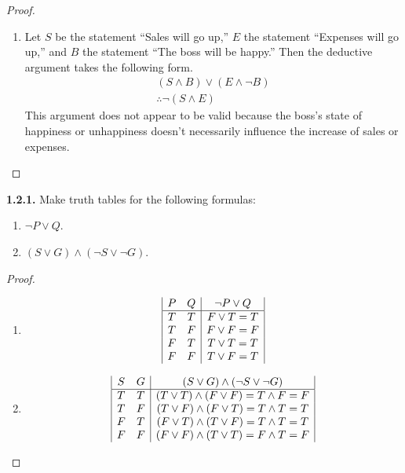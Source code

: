 \documentclass[12pt]{amsart}
\newenvironment{statement}[1]{\smallskip\noindent\color[rgb]{.6627, .3529, .6314} {\bf #1.}}{}
\theoremstyle{definition}
\theoremstyle{remark}
\begin{document}
\begin{proof}
\begin{enumerate}
	\item Let $S$ be the statement ``Sales will go up,'' $E$ the statement ``Expenses will go up,'' and $B$ the statement ``The boss will be happy.''
	Then the deductive argument takes the following form.
	\begin{equation*}
		\begin{array}{l}
			(S \wedge B) \vee (E \wedge \neg B) \\
			\hline
			\therefore \neg (S \wedge E)
		\end{array}
	\end{equation*}
	This argument does not appear to be valid because the boss's state of happiness or unhappiness doesn't necessarily influence the increase of sales or expenses.
\end{enumerate}
\end{proof}


\begin{statement}{1.2.1}
Make truth tables for the following formulas:
\begin{enumerate}
	\item $\neg P \vee Q$.
	\item $(S \vee G) \wedge (\neg S \vee \neg G)$.
\end{enumerate}
\end{statement}

\begin{proof}
\hfill
\begin{enumerate}
	\item 
	\begin{equation*}
		\begin{array}{| c c | c |}
			P & Q & \neg P \vee Q \\
			\hline
			T & T & F \vee T = T \\
			T & F & F \vee F = F \\
			F & T & T \vee T = T \\
			F & F & T \vee F = T
		\end{array}
	\end{equation*}
	
	\item 
	\begin{equation*}
		\begin{array}{| c c | c |}
			S & G & (S \vee G) \wedge (\neg S \vee \neg G) \\
			\hline
			T & T & (T \vee T) \wedge (F \vee F) = T \wedge F = F \\
			T & F & (T \vee F) \wedge (F \vee T) = T \wedge T = T \\
			F & T & (F \vee T) \wedge (T \vee F) = T \wedge T = T \\
			F & F & (F \vee F) \wedge (T \vee T) = F \wedge T = F
		\end{array}
	\end{equation*}
\end{enumerate}
\end{proof}
\end{document}
